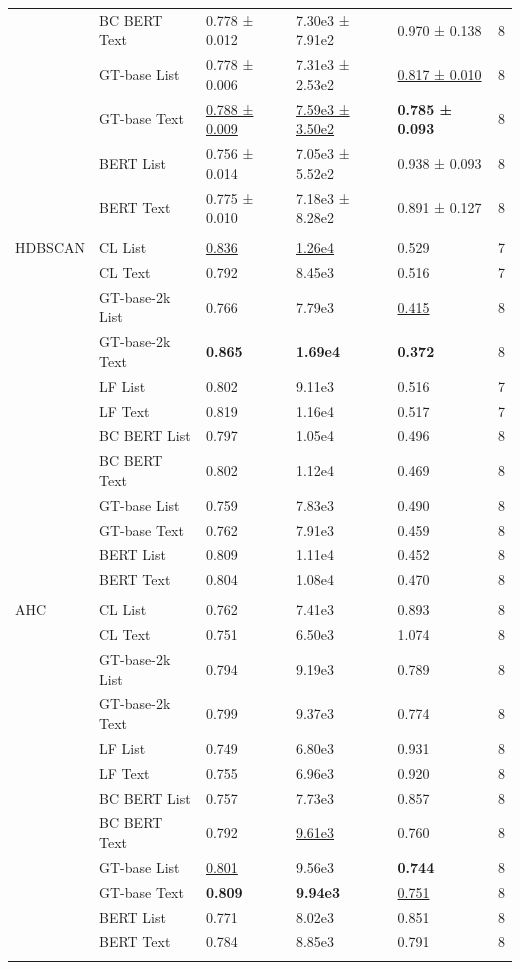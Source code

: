 \begin{table}[!h]
\begin{tabular}[t]{lllllr}
 & BC BERT Text & 0.778 ± 0.012 & 7.30e3 ± 7.91e2 & 0.970 ± 0.138 & 8\\
\addlinespace
 & GT-base List & 0.778 ± 0.006 & 7.31e3 ± 2.53e2 & \underline{0.817 ± 0.010} & 8\\
 & GT-base Text & \underline{0.788 ± 0.009} & \underline{7.59e3 ± 3.50e2} & \textbf{0.785 ± 0.093} & 8\\
 & BERT List & 0.756 ± 0.014 & 7.05e3 ± 5.52e2 & 0.938 ± 0.093 & 8\\
 & BERT Text & 0.775 ± 0.010 & 7.18e3 ± 8.28e2 & 0.891 ± 0.127 & 8\\
\midrule\\
HDBSCAN & CL List & \underline{0.836} & \underline{1.26e4} & 0.529 & 7\\
\addlinespace
 & CL Text & 0.792 & 8.45e3 & 0.516 & 7\\
 & GT-base-2k List & 0.766 & 7.79e3 & \underline{0.415} & 8\\
 & GT-base-2k Text & \textbf{0.865} & \textbf{1.69e4} & \textbf{0.372} & 8\\
 & LF List & 0.802 & 9.11e3 & 0.516 & 7\\
 & LF Text & 0.819 & 1.16e4 & 0.517 & 7\\
\addlinespace
 & BC BERT List & 0.797 & 1.05e4 & 0.496 & 8\\
 & BC BERT Text & 0.802 & 1.12e4 & 0.469 & 8\\
 & GT-base List & 0.759 & 7.83e3 & 0.490 & 8\\
 & GT-base Text & 0.762 & 7.91e3 & 0.459 & 8\\
 & BERT List & 0.809 & 1.11e4 & 0.452 & 8\\
\addlinespace
 & BERT Text & 0.804 & 1.08e4 & 0.470 & 8\\
\midrule\\
AHC & CL List & 0.762 & 7.41e3 & 0.893 & 8\\
 & CL Text & 0.751 & 6.50e3 & 1.074 & 8\\
 & GT-base-2k List & 0.794 & 9.19e3 & 0.789 & 8\\
 & GT-base-2k Text & 0.799 & 9.37e3 & 0.774 & 8\\
\addlinespace
 & LF List & 0.749 & 6.80e3 & 0.931 & 8\\
 & LF Text & 0.755 & 6.96e3 & 0.920 & 8\\
 & BC BERT List & 0.757 & 7.73e3 & 0.857 & 8\\
 & BC BERT Text & 0.792 & \underline{9.61e3} & 0.760 & 8\\
 & GT-base List & \underline{0.801} & 9.56e3 & \textbf{0.744} & 8\\
\addlinespace
 & GT-base Text & \textbf{0.809} & \textbf{9.94e3} & \underline{0.751} & 8\\
 & BERT List & 0.771 & 8.02e3 & 0.851 & 8\\
 & BERT Text & 0.784 & 8.85e3 & 0.791 & 8\\
\midrule\\
\bottomrule
\end{tabular}
\end{table}
